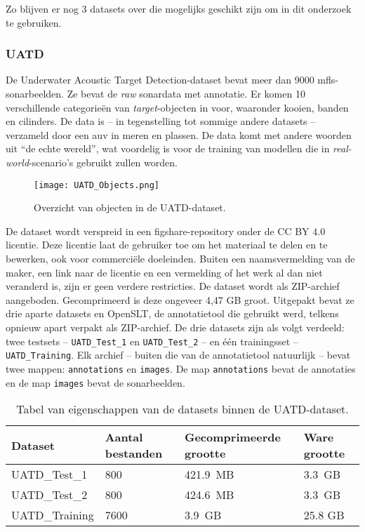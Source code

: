 Zo blijven er nog 3 datasets over die mogelijks geschikt zijn om in dit onderzoek te gebruiken. 

\newpage

\subsubsection{UATD}

De Underwater Acoustic Target Detection-dataset bevat meer dan 9000 \gls{mfls}-sonarbeelden. Ze bevat de \emph{raw} sonardata met annotatie. Er komen 10 verschillende categorieën van \emph{target}-objecten in voor, waaronder kooien, banden en cilinders. De data is -- in tegenstelling tot sommige andere datasets -- verzameld door een \gls{auv} in meren en plassen. De data komt met andere woorden uit ``de echte wereld'', wat voordelig is voor de training van modellen die in \emph{real-world}-scenario's gebruikt zullen worden. \autocite{Xie_2022}

\begin{figure}[H]
    \centering
    \texttt{[image: UATD\_Objects.png]}
    \caption[UATD Objecten.]{\label{fig:uatd_objects}Overzicht van objecten in de UATD-dataset. \autocite{Xie_2022}}
\end{figure}

De dataset wordt verspreid in een figshare-repository onder de CC BY 4.0 licentie. Deze licentie laat de gebruiker toe om het materiaal te delen en te bewerken, ook voor commerciële doeleinden. Buiten een naamsvermelding van de maker, een link naar de licentie en een vermelding of het werk al dan niet veranderd is, zijn er geen verdere restricties. De dataset wordt als ZIP-archief aangeboden. Gecomprimeerd is deze ongeveer 4,47 GB groot. Uitgepakt bevat ze drie aparte datasets en OpenSLT, de annotatietool die gebruikt werd, telkens opnieuw apart verpakt als ZIP-archief. De drie datasets zijn als volgt verdeeld: twee testsets -- \texttt{UATD\_Test\_1} en \texttt{UATD\_Test\_2} -- en één trainingsset -- \texttt{UATD\_Training}. Elk archief -- buiten die van de annotatietool natuurlijk -- bevat twee mappen: \texttt{annotations} en \texttt{images}. De map \texttt{annotations} bevat de annotaties en de map \texttt{images} bevat de sonarbeelden. \autocite{Jian_2022} \\

\begin{table}[H]
    \centering
    \begin{tabular}{llll}
        \toprule
        \textbf{Dataset} & \textbf{Aantal bestanden} & \textbf{Gecomprimeerde grootte} & \textbf{Ware grootte} \\
        \midrule
        UATD\_Test\_1  & 800  & 421.9 MB & 3.3 GB \\
        UATD\_Test\_2  & 800  & 424.6 MB & 3.3 GB \\
        UATD\_Training & 7600 & 3.9 GB   & 25.8 GB \\
        \bottomrule
    \end{tabular}
    \caption[Datasets binnen UATD]{\label{tab:uatd_datasets_overview} Tabel van eigenschappen van de datasets binnen de UATD-dataset. \autocite{Jian_2022}}
\end{table}

